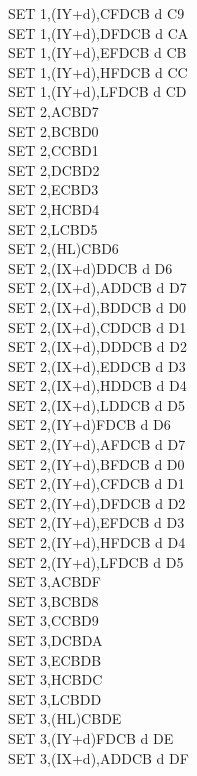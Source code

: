 \documentclass[12pt,twoside,openright,a4paper]{book}
\begin{document}
\begin{multicols}{3}
{\begin{tabbing}
		SET 1,(IY+d),C\UNDOC\>FDCB d C9\\
		SET 1,(IY+d),D\UNDOC\>FDCB d CA\\
		SET 1,(IY+d),E\UNDOC\>FDCB d CB\\
		SET 1,(IY+d),H\UNDOC\>FDCB d CC\\
		SET 1,(IY+d),L\UNDOC\>FDCB d CD\\
		SET 2,A\>CBD7\\
		SET 2,B\>CBD0\\
		SET 2,C\>CBD1\\
		SET 2,D\>CBD2\\
		SET 2,E\>CBD3\\
		SET 2,H\>CBD4\\
		SET 2,L\>CBD5\\
		SET 2,(HL)\>CBD6\\
		SET 2,(IX+d)\>DDCB d D6\\
		SET 2,(IX+d),A\UNDOC\>DDCB d D7\\
		SET 2,(IX+d),B\UNDOC\>DDCB d D0\\
		SET 2,(IX+d),C\UNDOC\>DDCB d D1\\
		SET 2,(IX+d),D\UNDOC\>DDCB d D2\\
		SET 2,(IX+d),E\UNDOC\>DDCB d D3\\
		SET 2,(IX+d),H\UNDOC\>DDCB d D4\\
		SET 2,(IX+d),L\UNDOC\>DDCB d D5\\
		SET 2,(IY+d)\>FDCB d D6\\
		SET 2,(IY+d),A\UNDOC\>FDCB d D7\\
		SET 2,(IY+d),B\UNDOC\>FDCB d D0\\
		SET 2,(IY+d),C\UNDOC\>FDCB d D1\\
		SET 2,(IY+d),D\UNDOC\>FDCB d D2\\
		SET 2,(IY+d),E\UNDOC\>FDCB d D3\\
		SET 2,(IY+d),H\UNDOC\>FDCB d D4\\
		SET 2,(IY+d),L\UNDOC\>FDCB d D5\\
		SET 3,A\>CBDF\\
		SET 3,B\>CBD8\\
		SET 3,C\>CBD9\\
		SET 3,D\>CBDA\\
		SET 3,E\>CBDB\\
		SET 3,H\>CBDC\\
		SET 3,L\>CBDD\\
		SET 3,(HL)\>CBDE\\
		SET 3,(IY+d)\>FDCB d DE\\
		SET 3,(IX+d),A\UNDOC\>DDCB d DF\\

\end{tabbing}}
\end{multicols}
\end{document}
